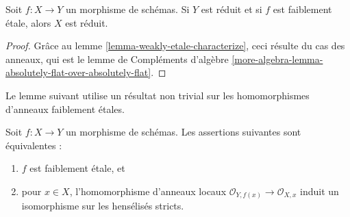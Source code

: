 \begin{lemma}
\label{lemma-reduced-goes-up}
Soit $f : X \to Y$ un morphisme de schémas.
Si $Y$ est réduit et si $f$ est faiblement \'etale, alors $X$ est réduit.
\end{lemma}

\begin{proof}
Grâce au lemme \ref{lemma-weakly-etale-characterize},
ceci résulte du cas des anneaux, qui est le
lemme de Compléments d'algèbre
\ref{more-algebra-lemma-absolutely-flat-over-absolutely-flat}.
\end{proof}

\noindent
Le lemme suivant utilise un résultat non trivial sur les homomorphismes d'anneaux
faiblement \'etales.

\begin{lemma}
\label{lemma-weakly-etale-strictly-henselian-local-rings}
Soit $f : X \to Y$ un morphisme de schémas.
Les assertions suivantes sont équivalentes :
\begin{enumerate}
\item $f$ est faiblement \'etale, et
\item pour $x \in X$, l'homomorphisme d'anneaux locaux
$\mathcal{O}_{Y, f(x)} \to \mathcal{O}_{X, x}$ induit un isomorphisme
sur les hensélisés stricts.
\end{enumerate}
\end{lemma}

